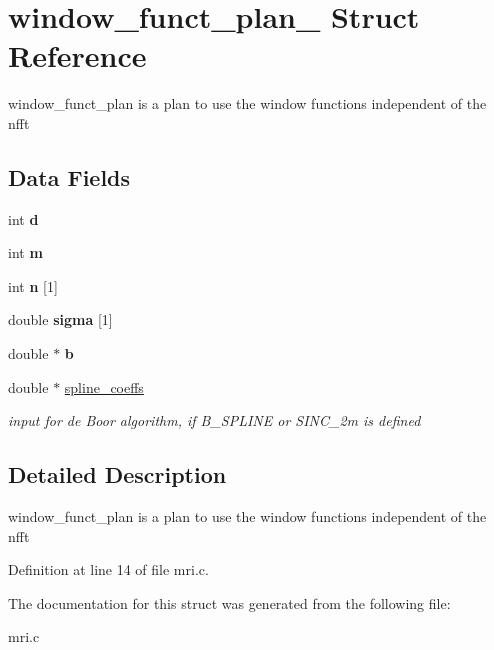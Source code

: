 \hypertarget{structwindow__funct__plan__}{
\section{window\_\-funct\_\-plan\_\- Struct Reference}
\label{structwindow__funct__plan__}
}
window\_\-funct\_\-plan is a plan to use the window functions independent of the nfft  


\subsection*{Data Fields}
\begin{CompactItemize}
\item 
\hypertarget{structwindow__funct__plan___o0}{
int {\bf d}}
\label{structwindow__funct__plan___o0}

\item 
\hypertarget{structwindow__funct__plan___o1}{
int {\bf m}}
\label{structwindow__funct__plan___o1}

\item 
\hypertarget{structwindow__funct__plan___o2}{
int {\bf n} \mbox{[}1\mbox{]}}
\label{structwindow__funct__plan___o2}

\item 
\hypertarget{structwindow__funct__plan___o3}{
double {\bf sigma} \mbox{[}1\mbox{]}}
\label{structwindow__funct__plan___o3}

\item 
\hypertarget{structwindow__funct__plan___o4}{
double $\ast$ {\bf b}}
\label{structwindow__funct__plan___o4}

\item 
\hypertarget{structwindow__funct__plan___o5}{
double $\ast$ \hyperlink{structwindow__funct__plan___o5}{spline\_\-coeffs}}
\label{structwindow__funct__plan___o5}

\begin{CompactList}\small\item\em input for de Boor algorithm, if B\_\-SPLINE or SINC\_\-2m is defined \item\end{CompactList}\end{CompactItemize}


\subsection{Detailed Description}
window\_\-funct\_\-plan is a plan to use the window functions independent of the nfft 



Definition at line 14 of file mri.c.

The documentation for this struct was generated from the following file:\begin{CompactItemize}
\item 
mri.c\end{CompactItemize}
